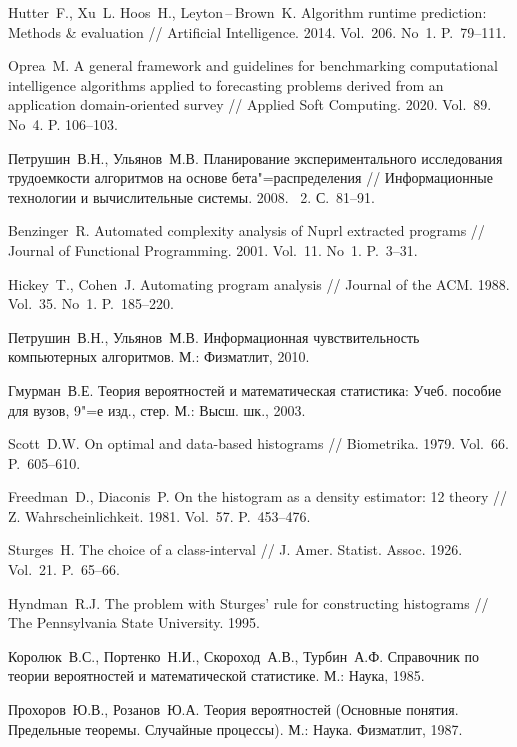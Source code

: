 \documentclass[a4paper, article, 14pt]{extarticle}
\newcommand*{\No}{\textnumero}
\begin{document}
\begin{thebibliography}{1}
	 Hutter~F., Xu~L. Hoos~H., Leyton\,--\,Brown~K. Algorithm runtime prediction: Methods \& evaluation // Artificial Intelligence. 2014. Vol.~206. No~1. P.~79--111.

	 Oprea~M. A general framework and guidelines for benchmarking computational intelligence algorithms applied to forecasting problems derived from an application domain-oriented survey // Applied Soft Computing. 2020. Vol.~89. No~4. P. 106--103.

	 Петрушин~В.\:Н., Ульянов~М.\:В. Планирование экспериментального исследования трудоемкости алгоритмов на основе бета"=распределения // Информационные технологии и вычислительные системы. 2008. \No~2. С.~81--91.

	 Benzinger~R. Automated complexity analysis of Nuprl extracted programs // Journal of Functional Programming. 2001. Vol.~11. No~1. P.~3--31.
	
	 Hickey~T., Cohen~J. Automating program analysis // Journal of the ACM. 1988. Vol.~35. No~1. P.~185--220.

	 Петрушин~В.\:Н., Ульянов~М.\:В. Информационная чувствительность компьютерных алгоритмов. М.: Физматлит, 2010.

	 Гмурман~В.\:Е. Теория вероятностей и математическая статистика: Учеб. пособие для вузов, 9"=е изд., стер. М.: Высш. шк., 2003.

	 Scott~D.\:W. On optimal and data-based histograms // Biometrika. 1979. Vol.~66. P.~605--610.
	
	 Freedman~D., Diaconis~P. On the histogram as a density estimator: 12 theory // Z. Wahrscheinlichkeit. 1981. Vol.~57. P.~453--476.

	 Sturges~H. The choice of a class-interval // J. Amer. Statist. Assoc. 1926.
	Vol.~21. P.~65--66.

	 Hyndman~R.\:J. The problem with Sturges' rule for constructing histograms // The Pennsylvania State University. 1995.

	 Королюк~В.\:С., Портенко~Н.\:И., Скороход~А.\:В., Турбин~А.\:Ф. Справочник по теории вероятностей и математической статистике. М.: Наука, 1985.

	 Прохоров~Ю.\:В., Розанов~Ю.\:А. Теория вероятностей (Основные понятия. Предельные теоремы. Случайные процессы). М.: Наука. Физматлит, 1987.


\end{thebibliography}
\end{document}
